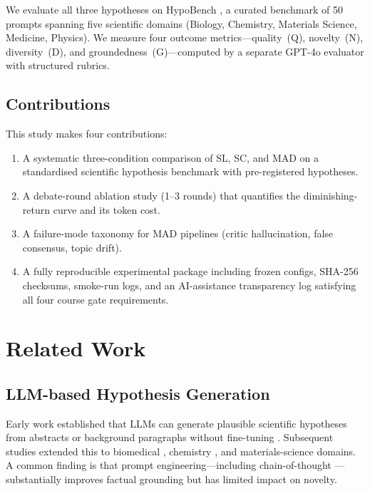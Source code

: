 We evaluate all three hypotheses on HypoBench \cite{Liu2025}, a curated benchmark
of 50 prompts spanning five scientific domains (Biology, Chemistry, Materials
Science, Medicine, Physics).  We measure four outcome metrics---quality~(Q),
novelty~(N), diversity~(D), and groundedness~(G)---computed by a separate
GPT-4o evaluator with structured rubrics.

\subsection*{Contributions}

This study makes four contributions:
\begin{enumerate}
  \item A systematic three-condition comparison of SL, SC, and MAD on a
    standardised scientific hypothesis benchmark with pre-registered hypotheses.
  \item A debate-round ablation study (1--3 rounds) that quantifies the
    diminishing-return curve and its token cost.
  \item A failure-mode taxonomy for MAD pipelines (critic hallucination, false
    consensus, topic drift).
  \item A fully reproducible experimental package including frozen configs,
    SHA-256 checksums, smoke-run logs, and an AI-assistance transparency log
    satisfying all four course gate requirements.
\end{enumerate}

\section{Related Work}
\label{sec:related}

\subsection{LLM-based Hypothesis Generation}

Early work established that LLMs can generate plausible scientific hypotheses
from abstracts or background paragraphs without fine-tuning
\cite{Qi2023,Yang2023,AbdelRehim2024}.  Subsequent studies extended this to
biomedical \cite{Qi2024}, chemistry \cite{Yang2024,Xu2025}, and
materials-science \cite{Ghafarollahi2024} domains.  A common finding is that
prompt engineering---including chain-of-thought \cite{Wei2022}---substantially
improves factual grounding but has limited impact on novelty.

